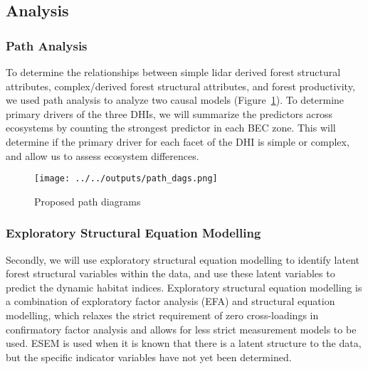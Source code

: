 \documentclass[
  authoryear,
  review,
  3p,
  twocolumn]{elsarticle}
\begin{document}
\hypertarget{analysis}{%
\subsection{Analysis}\label{analysis}}

\hypertarget{path-analysis}{%
\subsubsection{Path Analysis}\label{path-analysis}}

To determine the relationships between simple lidar derived forest
structural attributes, complex/derived forest structural attributes, and
forest productivity, we used path analysis to analyze two causal models
(Figure~\ref{fig-pathdag}). To determine primary drivers of the three
DHIs, we will summarize the predictors across ecosystems by counting the
strongest predictor in each BEC zone. This will determine if the primary
driver for each facet of the DHI is simple or complex, and allow us to
assess ecosystem differences.

\begin{figure}

{\centering \texttt{[image: ../../outputs/path\_dags.png]}

}

\caption{\label{fig-pathdag}Proposed path diagrams}

\end{figure}

\hypertarget{exploratory-structural-equation-modelling}{%
\subsubsection{Exploratory Structural Equation
Modelling}\label{exploratory-structural-equation-modelling}}

Secondly, we will use exploratory structural equation modelling
\citep{marsh2020, asparouhov2009} to identify latent forest structural
variables within the data, and use these latent variables to predict the
dynamic habitat indices. Exploratory structural equation modelling is a
combination of exploratory factor analysis (EFA) and structural equation
modelling, which relaxes the strict requirement of zero cross-loadings
in confirmatory factor analysis and allows for less strict measurement
models to be used. ESEM is used when it is known that there is a latent
structure to the data, but the specific indicator variables have not yet
been determined.
\end{document}
